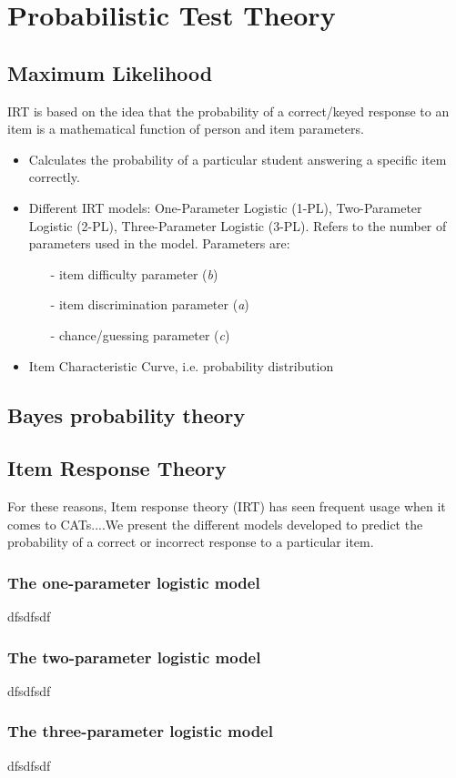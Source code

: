 \section{Probabilistic Test Theory}
\subsection{Maximum Likelihood}

IRT is based on the idea that the probability of a correct/keyed response to an item is a mathematical function of person and item parameters. 

\begin{itemize}
\item Calculates the probability of a particular student answering a specific item correctly.
\item Different IRT models: One-Parameter Logistic (1-PL), Two-Parameter Logistic (2-PL), Three-Parameter Logistic (3-PL). Refers to the number of parameters used in the model. Parameters are: 

\begin{itemize}
\item[-] item difficulty parameter (\textit{b})
\item[-] item discrimination parameter (\textit{a})
\item[-] chance/guessing parameter (\textit{c})
\end{itemize}

\item Item Characteristic Curve, i.e. probability distribution
\end{itemize}

\subsection{Bayes probability theory}

\subsection{Item Response Theory}
For these reasons, Item response theory (IRT) has seen frequent usage when it comes to CATs....We present the different models developed to predict the probability of a correct or incorrect response to a particular item.
\subsubsection{The one-parameter logistic model}
dfsdfsdf
\subsubsection{The two-parameter logistic model}
dfsdfsdf
\subsubsection{The three-parameter logistic model}
dfsdfsdf
